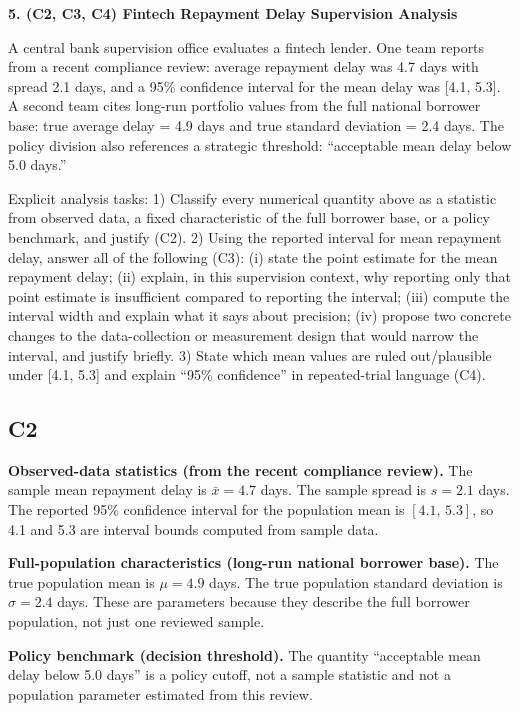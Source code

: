 \begin{ExamProblems}
		\newpage
		\item
		\textbf{5. (C2, C3, C4) Fintech Repayment Delay Supervision Analysis}
		
		A central bank supervision office evaluates a fintech lender.
		One team reports from a recent compliance review: average repayment delay was 4.7 days with spread 2.1 days, and a 95\% confidence interval for the mean delay was [4.1, 5.3].
		A second team cites long-run portfolio values from the full national borrower base: true average delay = 4.9 days and true standard deviation = 2.4 days.
		The policy division also references a strategic threshold: ``acceptable mean delay below 5.0 days.''
		
		Explicit analysis tasks:
		1) Classify every numerical quantity above as a statistic from observed data, a fixed characteristic of the full borrower base, or a policy benchmark, and justify (C2).
		2) Using the reported interval for mean repayment delay, answer all of the following (C3): (i) state the point estimate for the mean repayment delay; (ii) explain, in this supervision context, why reporting only that point estimate is insufficient compared to reporting the interval; (iii) compute the interval width and explain what it says about precision; (iv) propose two concrete changes to the data-collection or measurement design that would narrow the interval, and justify briefly.
		3) State which mean values are ruled out/plausible under [4.1, 5.3] and explain ``95\% confidence'' in repeated-trial language (C4).
		
		\subsection*{C2}
		\textbf{Observed-data statistics (from the recent compliance review).}
		The sample mean repayment delay is $\bar{x}=4.7$ days.
		The sample spread is $s=2.1$ days.
		The reported 95\% confidence interval for the population mean is $[4.1,\,5.3]$, so 4.1 and 5.3 are interval bounds computed from sample data.
		
		\textbf{Full-population characteristics (long-run national borrower base).}
		The true population mean is $\mu=4.9$ days.
		The true population standard deviation is $\sigma=2.4$ days.
		These are parameters because they describe the full borrower population, not just one reviewed sample.
		
		\textbf{Policy benchmark (decision threshold).}
		The quantity ``acceptable mean delay below 5.0 days'' is a policy cutoff, not a sample statistic and not a population parameter estimated from this review.
		

\end{ExamProblems}
